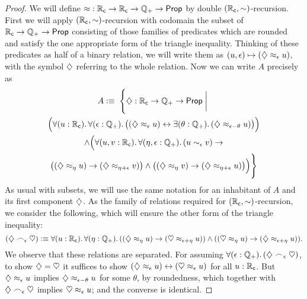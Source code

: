 \begin{proof}
  We will define $\mathord\approx:\mathbb{R}_\mathsf{c}\to\mathbb{R}_\mathsf{c}\to\mathbb{Q}_{+}\to\mathsf{Prop}$ by double $(\mathbb{R}_\mathsf{c},\mathord\sim)$-recursion.
  First we will apply $(\mathbb{R}_\mathsf{c},\mathord\sim)$-recursion with codomain the subset of $\mathbb{R}_\mathsf{c}\to\mathbb{Q}_{+}\to\mathsf{Prop}$ consisting of those families of predicates which are rounded and satisfy the one appropriate form of the triangle inequality.
  Thinking of these predicates as half of a binary relation, we will write them as $(u,\epsilon) \mapsto (\diamondsuit\approx_\epsilon u)$, with the symbol $\diamondsuit$ referring to the whole relation.
  Now we can write $A$ precisely as
  \begin{multline*}
    A \defeq\; \Bigg\{ \hapname :\RC\to\Qp\to\prop \;\bigg|\; \\
    \Big(\fall{u:\RC}{\epsilon:\Qp}
    \big((\hapx_\epsilon u) \leftrightarrow \exis{\theta:\Qp} (\hapx_{\epsilon-\theta} u)\big)\Big)  \\
    \land \Big(\fall{u,v:\RC}{\eta,\epsilon:\Qp} (u\close\epsilon v) \to\\
    \big((\hapx_\eta u) \to (\hapx_{\eta+\epsilon} v) \big) \land \big((\hapx_\eta v) \to (\hapx_{\eta+\epsilon} u) \big)\Big)\Bigg\}
  \end{multline*}
  As usual with subsets, we will use the same notation for an inhabitant of $A$ and its first component $\diamondsuit$.
  As the family of relations required for $(\mathbb{R}_\mathsf{c},\mathord\sim)$-recursion, we consider the following, which will ensure the other form of the triangle inequality:
  \begin{equation*}
    (\hapname \bsim_\epsilon \hapbname )
    \defeq \fall{u:\RC}{\eta:\Qp} ((\hapx_\eta u) \to (\hapxb_{\epsilon+\eta} u)) \land ((\hapxb_\eta u) \to (\hapx_{\epsilon+\eta} u)).
  \end{equation*}
  We observe that these relations are separated.
  For assuming $\fall{\epsilon:\Qp} (\hapname \bsim_\epsilon \hapbname)$, to show $\diamondsuit = \heartsuit$ it suffices to show $(\diamondsuit\approx_\epsilon u) \leftrightarrow (\heartsuit\approx_\epsilon u)$ for all $u:\mathbb{R}_\mathsf{c}$.
  But $\diamondsuit\approx_\epsilon u$ implies $\diamondsuit\approx_{\epsilon-\theta} u$ for some $\theta$, by roundedness, which together with $\diamondsuit \frown_\epsilon \heartsuit$ implies $\heartsuit\approx_\epsilon u$; and the converse is identical.


\end{proof}
